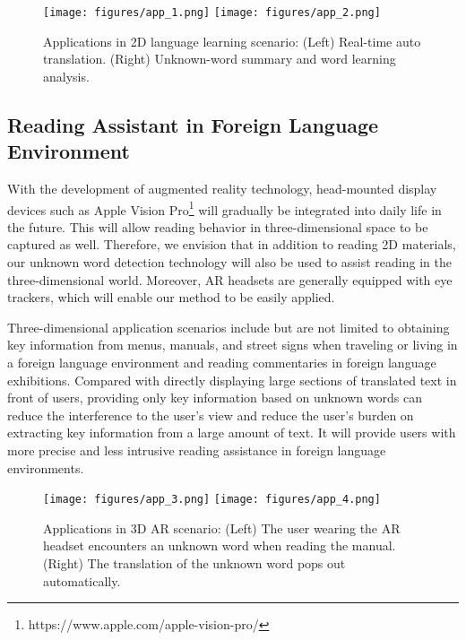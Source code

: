 \begin{figure}[htbp]
  \texttt{[image: figures/app\_1.png]}
  \texttt{[image: figures/app\_2.png]}

  \caption{Applications in 2D language learning scenario: (Left) Real-time auto translation. (Right) Unknown-word summary and word learning analysis.}
  \label{fig:application1} 
\end{figure}



\subsection{Reading Assistant in Foreign Language Environment}
With the development of augmented reality technology, head-mounted display devices such as Apple Vision Pro\footnote{https://www.apple.com/apple-vision-pro/} will gradually be integrated into daily life in the future. This will allow reading behavior in three-dimensional space to be captured as well. Therefore, we envision that in addition to reading 2D materials, our unknown word detection technology will also be used to assist reading in the three-dimensional world. Moreover, AR headsets are generally equipped with eye trackers, which will enable our method to be easily applied.

Three-dimensional application scenarios include but are not limited to obtaining key information from menus, manuals, and street signs when traveling or living in a foreign language environment and reading commentaries in foreign language exhibitions. Compared with directly displaying large sections of translated text in front of users, providing only key information based on unknown words can reduce the interference to the user's view and reduce the user's burden on extracting key information from a large amount of text. It will provide users with more precise and less intrusive reading assistance in foreign language environments.

\begin{figure}[htbp]
  \texttt{[image: figures/app\_3.png]}
  \texttt{[image: figures/app\_4.png]}

  \caption{Applications in 3D AR scenario: (Left) The user wearing the AR headset encounters an unknown word when reading the manual. (Right) The translation of the unknown word pops out automatically.}
  \label{fig:application2} 
\end{figure}

